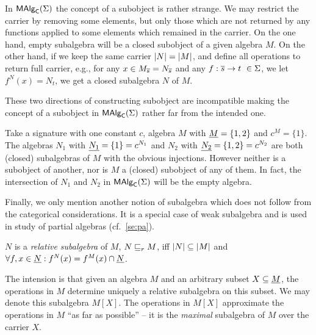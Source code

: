 \documentclass[10pt]{article}
\begin{document}

In $\mbox{\rm\sf MAlg}_{\sf C}(\Sigma)$ the concept of a subobject is rather strange.  We may
restrict the carrier by removing some elements, but only those which
are not returned by any functions applied to some elements which
remained in the carrier.  On the one hand, empty subalgebra will be a
closed subobject of a given algebra $M$. On the other hand, if we keep
the same carrier $|N|=|M|$, and define all operations to
return full carrier, e.g., for any $x\in M_{\overline {s}}=N_{\overline {s}}$
and any $f:{\overline {s}}\rightarrow t\ \in\Sigma$, we let $f^N(x)=N_t$, we
get a closed subalgebra $N$ of $M$.


These two directions of constructing subobject are incompatible making
the concept of a subobject in $\mbox{\rm\sf MAlg}_{\sf C}(\Sigma)$ rather far from the intended
one.

\begin{Example}
\label{ex:nointersect}
Take a signature with one constant $c$, algebra $M$ with $\underline {M}=\{1,2\}$ and $c^M=\{1\}$.  The algebras $N_1$ with
$\underline {N_1}=\{1\}=c^{N_{1}}$ and $N_2$ with
$\underline {N_2}=\{1,2\}=c^{N_{2}}$ are both (closed) subalgebras of $M$
with the obvious injections. However neither is a subobject of
another, nor is $M$ a (closed) subobject of any of them. In fact, the
intersection of $N_1$ and $N_2$ in $\mbox{\rm\sf MAlg}_{\sf C}(\Sigma)$ will be the empty algebra.
\end{Example}
%
Finally, we only mention another notion of subalgebra which
does not follow from the categorical considerations. It is a special
case of weak subalgebra and is used in study of partial algebras (cf.~\ref{se:pa}).

\begin{Definition}\label{de:relative}
$N$ is a {\em relative subalgebra} of $M$, $N\mathrel{\sqsubseteq}_r M$, iff $|N|\subseteq|M|$ and $\forall f, x\in\underline {N}:
f^N(x)=f^M(x)\cap\underline {N}$.
\end{Definition}
%
The intension is that given an algebra $M$ and an arbitrary subset
$X\subseteq\underline {M}$, the operations in $M$ determine uniquely a
relative subalgebra on this subset. We may denote this subalgebra
$M[X]$.  The operations in $M[X]$ approximate the operations in $M$
``as far as possible'' -- it is the {\em maximal} subalgebra of $M$
over the carrier $X$.
\end{document}
